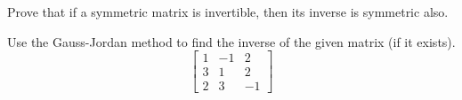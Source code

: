 \documentclass[12pt,letterpaper]{hmcpset}
\begin{document}
\begin{problem}[3.3.46]
Prove that if a symmetric matrix is invertible, then its inverse is symmetric also.
\end{problem}

\begin{solution}
\vfill
\end{solution}

\newpage

\begin{problem}[3.3.53]
Use the Gauss-Jordan method to find the inverse of the given matrix (if it exists).
$$\begin{bmatrix}
	1 & -1 & 2 \\
	3 & 1 & 2 \\
	2 & 3 & -1
	\end{bmatrix}$$
\end{problem}

\begin{solution}
\vfill
\end{solution}
	
\end{document}
